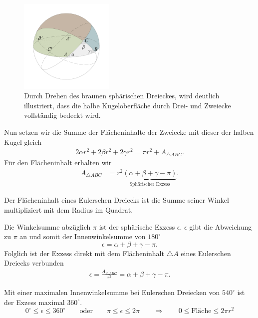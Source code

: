 \begin{refsection}
\begin{figure}[htbp]
\centering
\includegraphics[width=0.4\textwidth]{kugel/HalbeKugel.jpg}
\caption{Durch Drehen des braunen sphärischen Dreieckes, wird deutlich illustriert, dass die halbe Kugeloberfläche durch Drei- und Zweiecke vollständig bedeckt wird.}
\label{V9}
\end{figure}

Nun setzen wir die Summe der Flächeninhalte der Zweiecke mit dieser der halben Kugel gleich
\begin{align*}
2 \alpha r^2 + 2 \beta r^2 + 2 \gamma  r^2 = \pi r^2 + A_{ \triangle{ ABC }}.
\end{align*}
Für den Flächeninhalt erhalten wir
\begin{align*}
A_{ \triangle{ ABC }}  &= r^{ 2 }\underbrace{(\alpha + \beta + \gamma - \pi)}_{\text{Sphärischer Exzess}}.
\end{align*}

\begin{definition}
Der Flächeninhalt eines Eulerschen Dreiecks ist die Summe seiner Winkel multipliziert mit dem Radius im Quadrat.
\label{skript:kugel:satz:Flaecheninhalt}
\end{definition}


Die Winkelsumme abzüglich $\pi$ ist der sphärische Exzess $\epsilon$. $\epsilon$ gibt die Abweichung zu $\pi$ an und somit der Innenwinkelsumme von $180^{\circ}$
\begin{equation}
\epsilon = \alpha + \beta + \gamma - \pi.
\end{equation}
Folglich ist der Exzess direkt mit dem Flächeninhalt $\triangle A$ eines Eulerschen Dreiecks verbunden
\begin{align*}
\epsilon =\frac{A_{\triangle{ ABC }}}{r^2} = {\alpha + \beta + \gamma - \pi}.
\end{align*}

Mit einer maximalen Innenwinkelsumme bei Eulerschen Dreiecken von $540^{\circ}$ ist der Exzess maximal $360^{\circ}$.
\[
0^{\circ} \le \epsilon \le 360^{\circ}
\qquad \text{oder} \qquad
\pi \le \epsilon \le 2\pi
\qquad \Rightarrow \qquad
0 \le \text{Fläche} \le 2 \pi r^2
\]


\end{refsection}
